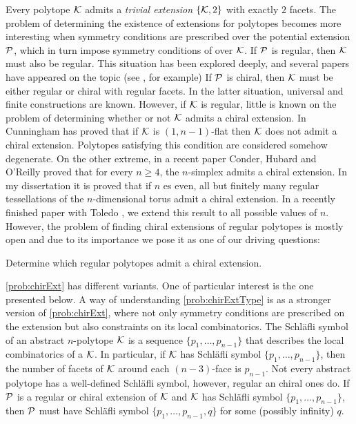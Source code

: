 \documentclass[a4paper,12pt,english]{article}
\begin{document}
Every polytope $\mathcal{K}$ admits a \emph{trivial extension} $\left\{ \mathcal{K}, 2 \right\} $ with exactly $2$ facets.
The problem of determining the existence of extensions for polytopes becomes more interesting when symmetry conditions are prescribed over the potential extension $\mathcal{P}$, which in turn impose symmetry conditions of over $\mathcal{K}$.
If $\mathcal{P}$ is regular, then $\mathcal{K}$ must also be regular.
This situation has been explored deeply, and several papers have appeared on the topic 
(see \cite{Pellicer2010_ExtensionsDuallyBipartite,Pellicer2009_ExtensionsRegularPolytopes,Schulte1985_ExtensionsRegularComplexes,Schulte1983_ArrangingRegularIncidence,Schulte1990_ClassAbstractPolytopes, Danzer1984_RegularIncidenceComplexes}, for example)
If $\mathcal{P}$ is chiral, then $\mathcal{K}$ must be either regular or chiral with regular facets.
In the latter situation, universal \cite{SchulWeiss1995_FreeExtensionsChiral} and finite \cite{CunniPelli2014_ChiralExtensionsChiral,Montero2021_SchlaefliSymbolChiral} constructions are known. However, if $\mathcal{K}$ is regular, little is known on the problem of determining whether or not $\mathcal{K}$ admits a chiral extension.
In \cite{Cunningham2017_NonFlatRegular} Cunningham has proved that if $\mathcal{K}$ is $(1,n-1)$-flat then $\mathcal{K}$ does not admit a chiral extension.
Polytopes satisfying this condition are considered somehow degenerate.
On the other extreme, in a recent paper \cite{CondHubORe2024_ConstructionChiralPolytopes} Conder, Hubard and O'Reilly proved that for every $n \geq 4$, the $n$-simplex admits a chiral extension.
In my dissertation \cite{Montero2019_ChiralExtensionsToroids_PhDThesis} it is proved that if $n$ es even, all but finitely many regular tessellations of the $n$-dimensional torus admit a chiral extension.
In a recently finished paper with Toledo \cite{MonteToled_ChiralExtensionsRegular_preprint}, we extend this result to all possible values of $n$.
However, the problem of finding chiral extensions of regular polytopes is mostly open and due to its importance we pose it as one of our driving questions: 

\begin{problem}\label{prob:chirExt}
 Determine which regular polytopes admit a chiral extension.
\end{problem}


\cref{prob:chirExt} has different variants. One of particular interest is the one presented below. A way of understanding \cref{prob:chirExtType} is as a stronger version of  \cref{prob:chirExt}, where not only symmetry conditions are prescribed on the extension but also constraints on its local combinatorics. 
The Schläfli symbol of an abstract $n$-polytope $\mathcal{K}$ is a sequence $\{p_{1}, \dots, p_{n-1}\}$ that describes the local combinatorics of a $\mathcal{K}$. 
In particular, if $\mathcal{K}$ has Schläfli symbol $\{p_{1}, \dots, p_{n-1}\}$, then the number of facets of $\mathcal{K}$ around each $(n-3)$-face is $p_{n-1}$.
Not every abstract polytope has a well-defined Schläfli symbol, however, regular an chiral ones do. 
If $\mathcal{P}$ is a regular or chiral extension of $\mathcal{K}$ and $\mathcal{K}$ has Schläfli symbol $\{p_{1}, \dots, p_{n-1}\}$, then $\mathcal{P}$ must have Schläfli symbol $\{p_{1}, \dots, p_{n-1}, q\}$ for some (possibly infinity) $q$.
\end{document}
